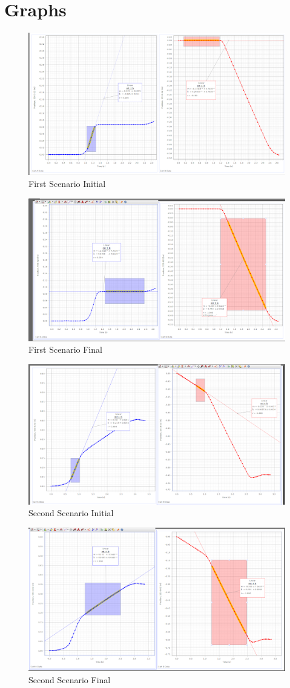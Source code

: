 \documentclass{article}
\begin{document}
\section{Graphs}
\begin{figure}[H]
    \centering
    \includegraphics[width=0.75\linewidth]{first scenario initial .png}
    \caption{First Scenario Initial}
    \label{fig:fsi}
\end{figure}
\begin{figure}[H]
    \centering
    \includegraphics[width=0.75\linewidth]{first scenario final.png}
    \caption{First Scenario Final}
    \label{fig:fsf}
\end{figure}
\begin{figure}[H]
    \centering
    \includegraphics[width=0.75\linewidth]{second scenario initial.png}
    \caption{Second Scenario Initial}
    \label{fig:ssi}
\end{figure}
\begin{figure}[H]
    \centering
    \includegraphics[width=0.75\linewidth]{second scenario final.png}
    \caption{Second Scenario Final}
    \label{fig:ssf}
\end{figure}
\end{document}
